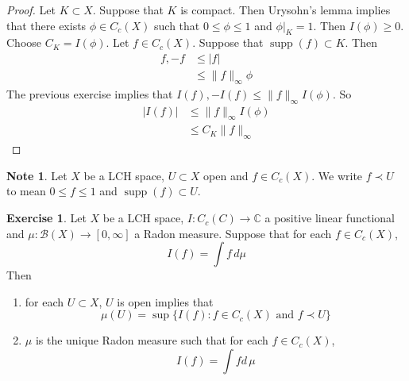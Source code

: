 \documentclass[12pt]{amsart}
\theoremstyle{definition}
\newtheorem{note}[definition]{Note}
\newtheorem{ex}[definition]{Exercise}
\newcommand{\C}{\mathbb{C}}
\newcommand{\MB}{\mathcal{B}}
\newcommand{\dmu}{\, d \mu}
\newcommand{\RG}{[0,\infty]}
\DeclareMathOperator{\supp}{supp}
\newcommand{\lex}[1]{\label{ex:#1}}
\begin{document}
	\begin{proof}
	Let $K \subset X$. Suppose that $K$ is compact. Then Urysohn's lemma implies that there exists $\phi \in C_c(X)$ such that $0 \leq \phi \leq 1$ and $\phi|_K = 1$. Then $I(\phi) \geq 0$. Choose $C_K = I(\phi)$. Let $f \in C_c(X)$. Suppose that $\supp(f) \subset K$. Then 
	\begin{align*}
	f,-f 
	&\leq |f| \\
	& \leq \|f\|_{\infty} \phi
	\end{align*}
	The previous exercise implies that $I(f), -I(f) \leq \|f\|_{\infty} I(\phi)$. So 
	\begin{align*}
	|I(f)| 
	&\leq \|f\|_{\infty} I(\phi) \\
	&\leq  C_K \|f\|_{\infty}  
	\end{align*}
	\end{proof}
	
	\begin{note}
	Let $X$ be a LCH space, $U \subset X$ open and $f \in C_c(X)$. We write $f \prec U$ to mean $0 \leq f \leq 1$ and $\supp(f) \subset U$. 
	\end{note}
	
	\begin{ex} \lex{00000} 
	Let $X$ be a LCH space, $I: C_c(C) \rightarrow \C$ a positive linear functional and $\mu:\MB(X) \rightarrow \RG$ a Radon measure. Suppose that for each $f \in C_c(X)$, $$I(f) = \int f \dmu$$
	Then 
	\begin{enumerate}
	\item for each $U \subset X$, $U$ is open implies that $$\mu(U) = \sup \{I(f): f \in C_c(X) \text{ and } f \prec U \}$$ 
	\item $\mu$ is the unique Radon measure such that for each $f \in C_c(X)$, $$I(f) = \int f d \, \mu$$
\end{enumerate}	 
	\end{ex}
	
\end{document}
